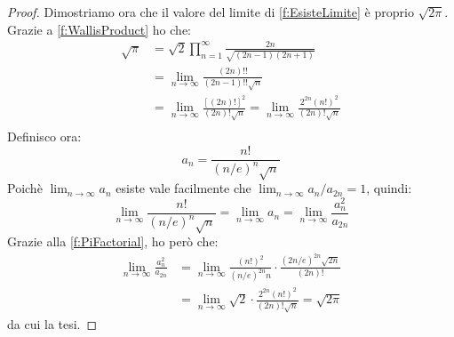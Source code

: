 \begin{proof}
	Dimostriamo ora che il valore del limite di \cref{f:EsisteLimite} è proprio $\sqrt{2\pi}$.
	Grazie a \cref{f:WallisProduct} ho che:
	\begin{equation}\label{f:PiFactorial}
	\begin{split}
		\sqrt{\pi}	& =\sqrt{2}\prod_{n=1}^\infty\frac{2n}{\sqrt{(2n-1)(2n+1)}}\\
					& =\lim_{n\to\infty}\frac{(2n)!!}{(2n-1)!!\sqrt{n}}\\
					& =\lim_{n\to\infty}\frac{\left[(2n)!\right]^2}{(2n)!\sqrt{n}}=\lim_{n\to\infty}\frac{2^{2n}\left(n!\right)^2}{(2n)!\sqrt{n}}\\
	\end{split}
	\end{equation}
	Definisco ora:
	\begin{equation*}
		a_n=\frac{n!}{(n/e)^n\sqrt{n}}
	\end{equation*}
	Poichè $\lim_{n\to\infty}{a_n}$ esiste vale facilmente che $\lim_{n\to\infty}a_n/a_{2n}=1$, quindi:
	\begin{equation*}
		\lim_{n\to\infty}{\frac{n!}{(n/e)^n\sqrt{n}}}=\lim_{n\to\infty}{a_n}=\lim_{n\to\infty}{\frac{a_n^2}{a_{2n}}}
	\end{equation*}
	Grazie alla \cref{f:PiFactorial}, ho però che:
	\begin{equation*}
	\begin{split}
		\lim_{n\to\infty}{\frac{a_n^2}{a_{2n}}}
		&=\lim_{n\to\infty}{\frac{\left(n!\right)^2}{(n/e)^{2n}n}\cdot \frac{(2n/e)^{2n}\sqrt{2n}}{(2n)!} }\\
		&=\lim_{n\to\infty}{\sqrt{2}\cdot\frac{2^{2n} \left(n!\right)^2}{(2n)!\sqrt{n}} }=\sqrt{2\pi}
	\end{split}
	\end{equation*}
	da cui la tesi.
\end{proof}
